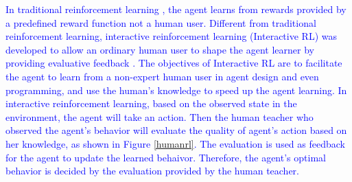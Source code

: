 \textcolor{blue}{In traditional reinforcement learning \cite{sutton1998reinforcement,kaelbling1996reinforcement}, the agent learns from rewards provided by a predefined reward function not a human user. %
Different from traditional reinforcement learning, interactive reinforcement learning (Interactive RL) was developed to allow  %
an ordinary human user %
to shape the agent learner by providing evaluative feedback \cite{thomaz2008teachable,knox2009interactively,tenorio2010dynamic,loftin2015learning,macglashan2017interactive}.  %
The objectives of Interactive RL are to facilitate the agent to learn from a non-expert human user in agent design and even programming, and use the human's knowledge to speed up the agent learning. %
In interactive reinforcement learning, based on the observed state in the environment, the agent will take an action. Then the human teacher who observed the agent's behavior will evaluate the quality of agent's action based on her knowledge, as shown in Figure \ref{humanrl}. The evaluation is used as feedback for the agent to update the learned behaivor. Therefore, the agent's optimal behavior is decided by the evaluation provided by the human teacher. %
}
